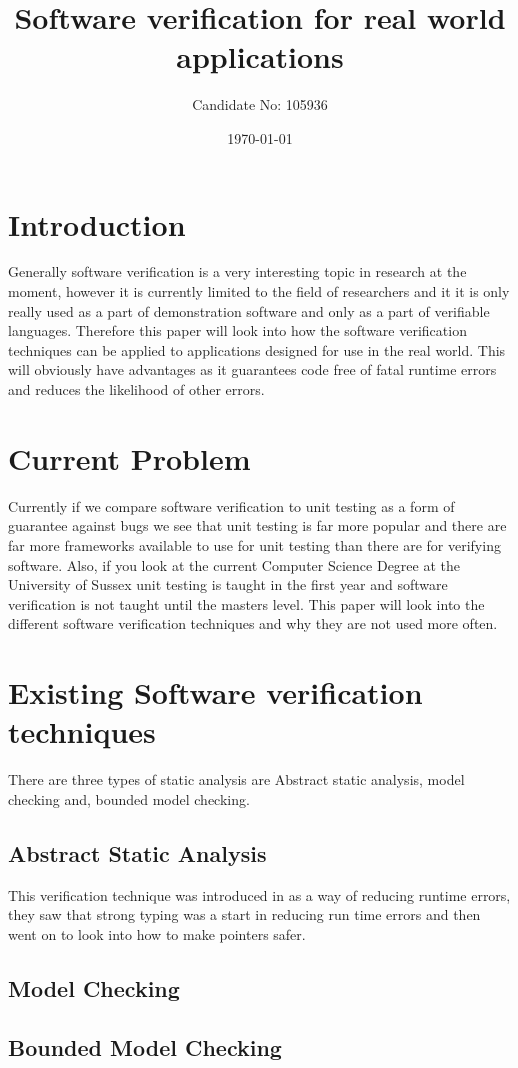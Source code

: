 \documentclass[a4paper,12pt]{scrartcl}
\title{Software verification for real world applications}
\author{Candidate No: 105936}
\date{\today}
\begin{document}
	
	\begin{titlepage}
		\maketitle
	\end{titlepage}
	
	\tableofcontents
	\newpage
	\section{Introduction}
	{
		Generally software verification is a very interesting topic in research at the moment, however it is currently limited to the field of researchers and it it is only really used as a part of demonstration software and only as a part of verifiable languages. Therefore this paper will look into how the software verification techniques can be applied to applications designed for use in the real world. This will obviously have advantages as it guarantees code free of fatal runtime errors and reduces the likelihood of other errors.
	}

	\section{Current Problem}
	{
		Currently if we compare software verification to unit testing as a form of guarantee against bugs we see that unit testing is far more popular and there are far more frameworks available to use for unit testing than there are for verifying software. Also, if you look at the current Computer Science Degree at the University of Sussex unit testing is taught in the first year and software verification is not taught until the masters level. This paper will look into the different software verification techniques and why they are not used more often.
	}
	
	\section{Existing Software verification techniques}
	{
		There are three types of static analysis are Abstract static analysis, model checking and, bounded model checking.\cite{DSilva2008} 
		\subsection{Abstract Static Analysis}
		{
			This verification technique was introduced in \cite{Cousot1977} as a way of reducing runtime errors, they saw that strong typing was a start in reducing run time errors and then went on to look into how to make pointers safer. 
		}
		\subsection{Model Checking}
		
		\subsection{Bounded Model Checking}
	}
	
\end{document}
